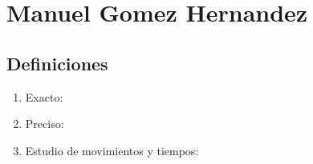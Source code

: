 \section{Manuel Gomez Hernandez}
\subsection{Definiciones}

\begin{enumerate}
    \item Exacto: 
    \item Preciso:
    \item Estudio de movimientos y tiempos:
\end{enumerate}


